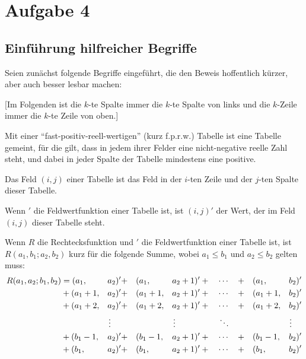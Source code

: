 \section{Aufgabe 4}

\subsection*{Einführung hilfreicher Begriffe}

Seien zunächst folgende Begriffe eingeführt, die den Beweis hoffentlich kürzer, aber auch besser lesbar machen:

[Im Folgenden ist die $k$-te Spalte immer die $k$-te Spalte von links und die $k$-Zeile immer die $k$-te Zeile von oben.]
\begin{definition}
    Mit einer "`fast-positiv-reell-wertigen"' (kurz f.p.r.w.) Tabelle ist eine Tabelle gemeint, für die gilt, dass 
    in jedem ihrer Felder eine nicht-negative reelle Zahl steht, und dabei in jeder Spalte der Tabelle mindestens 
    eine positive.
\end{definition}
\begin{definition}
    Das Feld $(i, j)$ einer Tabelle ist das Feld in der $i$-ten Zeile und der $j$-ten Spalte dieser Tabelle.
\end{definition}
\begin{definition}
    Wenn $'$ die Feldwertfunktion einer Tabelle ist, ist $(i, j)'$ der Wert, der im Feld $(i, j)$ dieser Tabelle 
    steht.
\end{definition}
\begin{definition}\label{rfunktion}
    Wenn $R$ die Rechtecksfunktion und $'$ die Feldwertfunktion einer Tabelle ist, ist $R(a_1, b_1; a_2, b_2)$ kurz 
    für die folgende Summe, wobei $a_1\leq b_1$ und $a_2\leq b_2$ gelten muss:
    \begin{alignat*}{6}
        R(a_1, a_2; b_1, b_2) &= (a_1, &&a_2)' + &&(a_1, &&a_2+1)' + \quad \cdots \quad + &&(a_1, &&b_2)'\\
        &+(a_1+1, &&a_2)' + &&(a_1+1, &&a_2+1)' +\quad \cdots \quad + &&(a_1+1, &&b_2)'\\
        &+(a_1+2, &&a_2)' + &&(a_1+2, &&a_2+1)' +\quad \cdots \quad + &&(a_1+2, &&b_2)'\\
        & &&\vdotswithin{a} && &&\vdotswithin{a}\quad\quad\quad\quad\quad \ddots && &&\vdotswithin{b} \\
        &+(b_1-1, &&a_2)' + &&(b_1-1, &&a_2+1)' +\quad \cdots \quad + &&(b_1-1, &&b_2)'\\
        &+(b_1, &&a_2)' + &&(b_1, &&a_2+1)' + \quad \cdots \quad + &&(b_1, &&b_2)'
    \end{alignat*}    
\end{definition}

